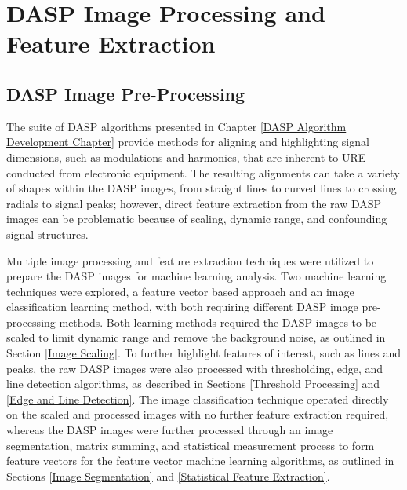 
\chapter{DASP Image Processing and Feature Extraction}
\label{DASP Feature Extraction Chapter}

\section[DASP Image Pre-Processing]{DASP Image Pre-Processing}
\label{DASP Image Pre-Processing Section}

The suite of DASP algorithms presented in Chapter \ref{DASP Algorithm Development Chapter} provide methods for aligning and highlighting signal dimensions, such as modulations and harmonics, that are inherent to URE conducted from electronic equipment.  The resulting alignments can take a variety of shapes within the DASP images, from straight lines to curved lines to crossing radials to signal peaks; however, direct feature extraction from the raw DASP images can be problematic because of scaling, dynamic range, and confounding signal structures.

Multiple image processing and feature extraction techniques were utilized to prepare the DASP images for machine learning analysis.  Two machine learning techniques were explored, a feature vector based approach and an image classification learning method, with both requiring different DASP image pre-processing methods.  Both learning methods required the DASP images to be scaled to limit dynamic range and remove the background noise, as outlined in Section \ref{Image Scaling}.  To further highlight features of interest, such as lines and peaks, the raw DASP images were also processed with thresholding, edge, and line detection algorithms, as described in Sections \ref{Threshold Processing} and \ref{Edge and Line Detection}.  The image classification technique operated directly on the scaled and processed images with no further feature extraction required, whereas the DASP images were further processed through an image segmentation, matrix summing, and statistical measurement process to form feature vectors for the feature vector machine learning algorithms, as outlined in Sections \ref{Image Segmentation} and \ref{Statistical Feature Extraction}.

